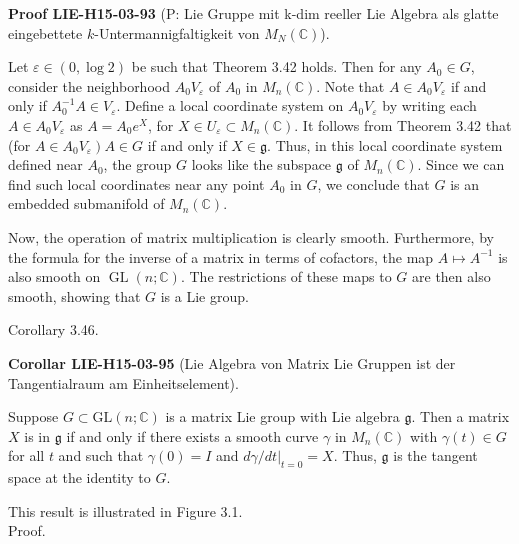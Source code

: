 \documentclass[10pt, letterpaper]{article}
\newcommand{\C}{\mathbb{C}}
\newcommand{\CustomHeading}[3]{%
  \par\medskip\noindent%
  \textbf{#1 #2} \textnormal{(#3)}.\enskip%
}
\newenvironment{KORO}[2]{\begin{unitbox}\CustomHeading{Corollar}{#1}{#2}}{\end{unitbox}}
\newenvironment{PROOF}[2]{\begin{unitbox}\CustomHeading{Proof}{#1}{#2}}{\end{unitbox}}
\begin{document}
\begin{PROOF}{LIE-H15-03-93}{P: Lie Gruppe mit k-dim reeller Lie Algebra als glatte eingebettete $k$-Untermannigfaltigkeit von $M_N(\C)$}
Let $\varepsilon \in(0, \log 2)$ be such that Theorem 3.42 holds. Then for any $A_{0} \in G$, consider the neighborhood $A_{0} V_{\varepsilon}$ of $A_{0}$ in $M_{n}(\mathbb{C})$. Note that $A \in A_{0} V_{\varepsilon}$ if and only if $A_{0}^{-1} A \in V_{\varepsilon}$. Define a local coordinate system on $A_{0} V_{\varepsilon}$ by writing each $A \in A_{0} V_{\varepsilon}$ as $A=A_{0} e^{X}$, for $X \in U_{\varepsilon} \subset M_{n}(\mathbb{C})$. It follows from Theorem 3.42 that (for $\left.A \in A_{0} V_{\varepsilon}\right) A \in G$ if and only if $X \in \mathfrak{g}$. Thus, in this local coordinate system defined near $A_{0}$, the group $G$ looks like the subspace $\mathfrak{g}$ of $M_{n}(\mathbb{C})$. Since we can find such local coordinates near any point $A_{0}$ in $G$, we conclude that $G$ is an embedded submanifold of $M_{n}(\mathbb{C})$.

Now, the operation of matrix multiplication is clearly smooth. Furthermore, by the formula for the inverse of a matrix in terms of cofactors, the map $A \mapsto A^{-1}$ is also smooth on $\operatorname{GL}(n ; \mathbb{C})$. The restrictions of these maps to $G$ are then also smooth, showing that $G$ is a Lie group.
\end{PROOF}

Corollary 3.46. 


\begin{KORO}{LIE-H15-03-95}{Lie Algebra von Matrix Lie Gruppen ist der Tangentialraum am Einheitselement}
Suppose $G \subset \mathrm{GL}(n ; \mathbb{C})$ is a matrix Lie group with Lie algebra $\mathfrak{g}$. Then a matrix $X$ is in $\mathfrak{g}$ if and only if there exists a smooth curve $\gamma$ in $M_{n}(\mathbb{C})$ with $\gamma(t) \in G$ for all $t$ and such that $\gamma(0)=I$ and $d \gamma /\left.d t\right|_{t=0}=X$. Thus, $\mathfrak{g}$ is the tangent space at the identity to $G$.
\end{KORO}

This result is illustrated in Figure 3.1.\\


Proof. 
\end{document}
